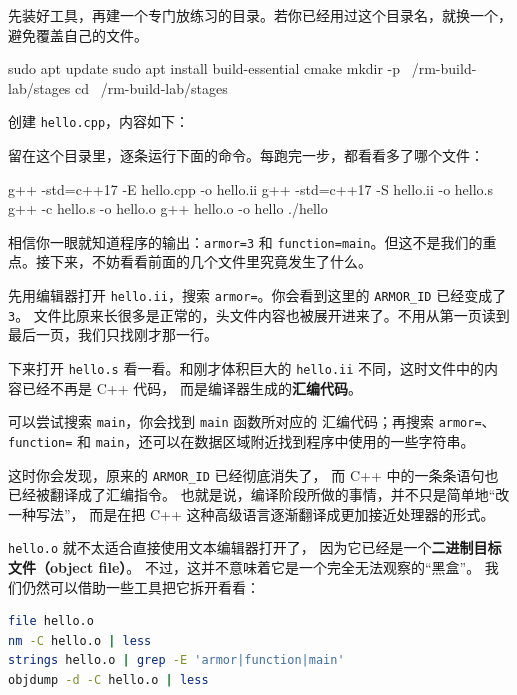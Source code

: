 \begin{example}[亲眼看到四种产物]
先装好工具，再建一个专门放练习的目录。若你已经用过这个目录名，就换一个，避免覆盖自己的文件。
\begin{tbash}
sudo apt update
sudo apt install build-essential cmake
mkdir -p ~/rm-build-lab/stages
cd ~/rm-build-lab/stages
\end{tbash}
创建 \texttt{hello.cpp}，内容如下：


留在这个目录里，逐条运行下面的命令。每跑完一步，都看看多了哪个文件：
\begin{tbash}
g++ -std=c++17 -E hello.cpp -o hello.ii
g++ -std=c++17 -S hello.ii -o hello.s
g++ -c hello.s -o hello.o
g++ hello.o -o hello
./hello
\end{tbash}

相信你一眼就知道程序的输出：\texttt{armor=3} 和 \texttt{function=main}。但这不是我们的重点。接下来，不妨看看前面的几个文件里究竟发生了什么。

先用编辑器打开 \texttt{hello.ii}，搜索 \texttt{armor=}。你会看到这里的 \texttt{ARMOR\_ID} 已经变成了 \texttt{3}。
文件比原来长很多是正常的，头文件内容也被展开进来了。不用从第一页读到最后一页，我们只找刚才那一行。

下来打开 \texttt{hello.s} 看一看。和刚才体积巨大的
\texttt{hello.ii} 不同，这时文件中的内容已经不再是 C++ 代码，
而是编译器生成的\textbf{汇编代码}。

可以尝试搜索 \texttt{main}，你会找到 \texttt{main} 函数所对应的
汇编代码；再搜索 \texttt{armor=}、\texttt{function=} 和
\texttt{main}，还可以在数据区域附近找到程序中使用的一些字符串。

这时你会发现，原来的 \texttt{ARMOR\_ID} 已经彻底消失了，
而 C++ 中的一条条语句也已经被翻译成了汇编指令。
也就是说，编译阶段所做的事情，并不只是简单地``改一种写法''，
而是在把 C++ 这种高级语言逐渐翻译成更加接近处理器的形式。

\texttt{hello.o} 就不太适合直接使用文本编辑器打开了，
因为它已经是一个\textbf{二进制目标文件（object file）}。
不过，这并不意味着它是一个完全无法观察的``黑盒''。
我们仍然可以借助一些工具把它拆开看看：

\begin{lstlisting}[language=bash]
file hello.o
nm -C hello.o | less
strings hello.o | grep -E 'armor|function|main'
objdump -d -C hello.o | less
\end{lstlisting}


\end{example}
